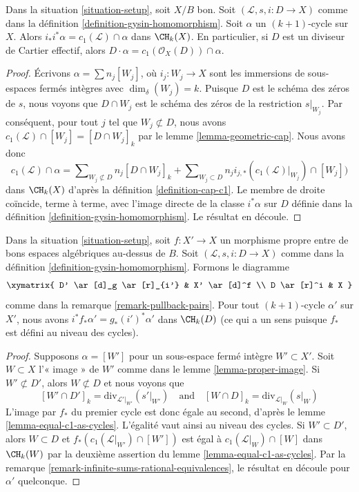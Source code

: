 \begin{lemma}
\label{lemma-support-cap-effective-Cartier}
Dans la situation \ref{situation-setup}, soit $X/B$ bon. Soit
$(\mathcal{L}, s, i : D \to X)$ comme dans la définition
\ref{definition-gysin-homomorphism}. Soit $\alpha$ un $(k + 1)$-cycle sur $X$.
Alors $i_*i^*\alpha = c_1(\mathcal{L}) \cap \alpha$ dans $\CH_k(X)$. En
particulier, si $D$ est un diviseur de Cartier effectif, alors $D \cdot \alpha =
c_1(\mathcal{O}_X(D)) \cap \alpha$.
\end{lemma}

\begin{proof}
Écrivons $\alpha = \sum n_j[W_j]$, où $i_j : W_j \to X$ sont les immersions de sous-espaces
fermés intègres avec $\dim_\delta(W_j) = k$. Puisque $D$ est le schéma des zéros
de $s$, nous voyons que $D \cap W_j$ est le schéma des zéros de
la restriction $s|_{W_j}$. Par conséquent, pour tout $j$ tel que $W_j \not
\subset D$, nous avons $c_1(\mathcal{L}) \cap [W_j] = [D \cap W_j]_k$ par le
lemme \ref{lemma-geometric-cap}. Nous avons donc
$$
c_1(\mathcal{L}) \cap \alpha
=
\sum\nolimits_{W_j \not \subset D} n_j[D \cap W_j]_k
+
\sum\nolimits_{W_j \subset D}
n_j i_{j, *}(c_1(\mathcal{L})|_{W_j}) \cap [W_j])
$$
dans $\CH_k(X)$ d'après la définition \ref{definition-cap-c1}. Le membre de droite
coïncide, terme à terme, avec l'image directe de la classe $i^*\alpha$ sur $D$
définie dans la définition \ref{definition-gysin-homomorphism}. Le résultat en découle.
\end{proof}

\begin{lemma}
\label{lemma-closed-in-X-gysin}
Dans la situation \ref{situation-setup}, soit $f : X' \to X$ un morphisme
propre entre de bons espaces algébriques au-dessus de $B$. Soit $(\mathcal{L}, s, i : D \to
X)$ comme dans la définition \ref{definition-gysin-homomorphism}. Formons le
diagramme
$$
\xymatrix{
D' \ar[d]_g \ar[r]_{i'} & X' \ar[d]^f \\
D \ar[r]^i & X
}
$$
comme dans la remarque \ref{remark-pullback-pairs}. Pour tout $(k + 1)$-cycle
$\alpha'$ sur $X'$, nous avons $i^*f_*\alpha' = g_*(i')^*\alpha'$ dans
$\CH_k(D)$ (ce qui a un sens puisque $f_*$ est défini au niveau des cycles).
\end{lemma}

\begin{proof}
Supposons $\alpha = [W']$ pour un sous-espace fermé intègre $W' \subset X'$.
Soit $W \subset X$ l'« image » de $W'$ comme dans le lemme
\ref{lemma-proper-image}. Si $W' \not \subset D'$, alors $W \not
\subset D$ et nous voyons que
$$
[W' \cap D']_k = \text{div}_{\mathcal{L}'|_{W'}}({s'|_{W'}})
\quad\text{and}\quad
[W \cap D]_k = \text{div}_{\mathcal{L}|_W}(s|_W)
$$
L'image par $f_*$ du premier cycle est donc égale au second, d'après le lemme
\ref{lemma-equal-c1-as-cycles}.
L'égalité vaut ainsi au niveau des cycles.
Si $W' \subset D'$, alors $W \subset D$ et
$f_*(c_1(\mathcal{L}|_{W'}) \cap [W'])$ est égal à $c_1(\mathcal{L}|_W) \cap
[W]$ dans $\CH_k(W)$ par la deuxième assertion du lemme
\ref{lemma-equal-c1-as-cycles}. Par la remarque
\ref{remark-infinite-sums-rational-equivalences}, le résultat en découle pour
$\alpha'$ quelconque.
\end{proof}

